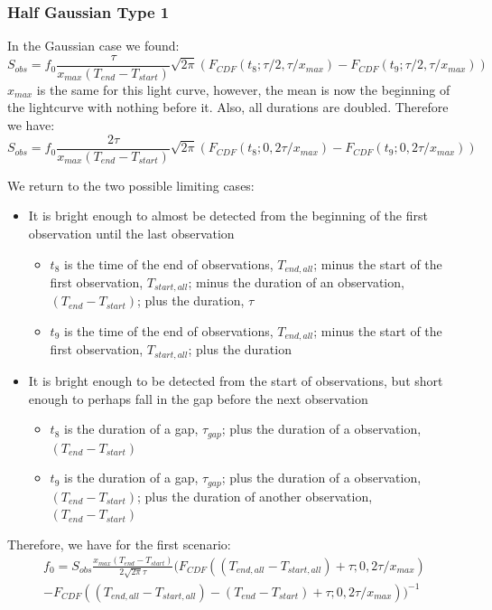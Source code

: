 \documentclass{article}
\begin{document}
\subsubsection{Half Gaussian Type 1}
In the Gaussian case we found:
\[S_{obs} = f_0 \frac{\tau}{x_{max}(T_{end} - T_{start})}\sqrt{2\pi}(F_{CDF}(t_8; \tau/2,\tau/x_{max}) -F_{CDF}(t_9; \tau/2, \tau/x_{max}))\]
$x_{max}$ is the same for this light curve, however, the mean is now the beginning of the lightcurve with nothing before it. Also, all durations are doubled. Therefore we have:
\[S_{obs} = f_0 \frac{2\tau}{x_{max}(T_{end} - T_{start})}\sqrt{2\pi}(F_{CDF}(t_8; 0,2\tau/x_{max}) -F_{CDF}(t_9; 0, 2\tau/x_{max}))\]

We return to the two possible limiting cases:
\begin{itemize}
	\item It is bright enough to almost be detected from the beginning of the first observation until the last observation \begin{itemize}
		\item $t_8$ is the time of the end of observations, $T_{end, all}$; minus the start of the first observation, $T_{start, all}$; minus the duration of an observation, $(T_{end}-T_{start})$; plus the duration, $\tau$
		\item $t_9$ is the time of the end of observations,  $T_{end, all}$; minus the start of the first observation, $T_{start, all}$; plus the duration
	\end{itemize}
	\item It is bright enough to be detected from the start of observations, but short enough to perhaps fall in the gap before the next observation\begin{itemize}
		\item $t_8$ is the duration of a gap, $\tau_{gap}$; plus the duration of a observation, $(T_{end}-T_{start})$
		\item $t_9$ is the duration of a gap, $\tau_{gap}$; plus the duration of a observation, $(T_{end}-T_{start})$; plus the duration of another observation, $(T_{end}-T_{start})$
	\end{itemize} 
\end{itemize}
Therefore, we have for the first scenario:
\begin{equation}
\begin{split}
f_0  =  S_{obs}\frac{x_{max}(T_{end} - T_{start})}{2\sqrt{2\pi}\tau} ( F_{CDF}((T_{end, all} - T_{start, all}) + \tau; 0, 2\tau/x_{max})\\-F_{CDF}((T_{end, all}-T_{start, all})-(T_{end}-T_{start})+ \tau; 0,2\tau/x_{max}))^{-1}
\end{split}
\end{equation}
\end{document}
